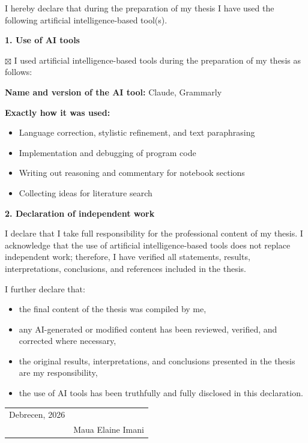 \documentclass[12pt,a4paper,oneside]{article}
\begin{document}
I hereby declare that during the preparation of my thesis I have used the following artificial intelligence-based tool(s).

\bigskip
\noindent\textbf{1. Use of AI tools}

\bigskip
\noindent$\boxtimes$ I used artificial intelligence-based tools during the preparation of my thesis as follows:

\bigskip
\noindent\textbf{Name and version of the AI tool:} Claude, Grammarly

\bigskip
\noindent\textbf{Exactly how it was used:}
\begin{itemize}
    \item Language correction, stylistic refinement, and text paraphrasing
    \item Implementation and debugging of program code
    \item Writing out reasoning and commentary for notebook sections
    \item Collecting ideas for literature search
\end{itemize}

\bigskip
\noindent\textbf{2. Declaration of independent work}

\bigskip
\noindent I declare that I take full responsibility for the professional content of my thesis. I acknowledge that the use of artificial intelligence-based tools does not replace independent work; therefore, I have verified all statements, results, interpretations, conclusions, and references included in the thesis.

\bigskip
\noindent I further declare that:
\begin{itemize}
    \item the final content of the thesis was compiled by me,
    \item any AI-generated or modified content has been reviewed, verified, and corrected where necessary,
    \item the original results, interpretations, and conclusions presented in the thesis are my responsibility,
    \item the use of AI tools has been truthfully and fully disclosed in this declaration.
\end{itemize}

\vspace{2cm}
\noindent\begin{tabular}{@{}p{6cm}p{6cm}@{}}
Debrecen, 2026 & \dotfill \\
& Maua Elaine Imani \\
\end{tabular}
\end{document}
